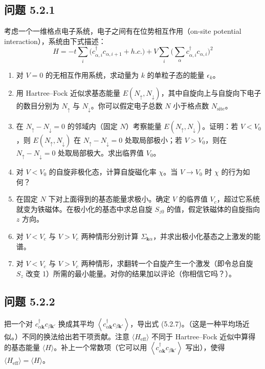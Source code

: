\subsection*{问题 5.2.1}

考虑一个一维格点电子系统，电子之间有在位势相互作用（on-site potential interaction），系统由下式描述：
\begin{equation*}
H = -t \sum_{i} \big( c^{\dagger}_{\alpha,i} c_{\alpha,i+1} + h.c. \big) + V \sum_{i} \Big( \sum_{\alpha} c^{\dagger}_{\alpha,i} c_{\alpha,i} \Big)^{2}
\end{equation*}

\begin{enumerate}
\item 对 $V=0$ 的无相互作用系统，求动量为 $k$ 的单粒子态的能量 $\epsilon_k$。
\item 用 Hartree--Fock 近似求基态能量 $E(N_{\uparrow}, N_{\downarrow})$，其中自旋向上与自旋向下电子的数目分别为 $N_{\uparrow}$ 与 $N_{\downarrow}$。你可以假定电子总数 $N$ 小于格点数 $N_{\mathrm{site}}$。
\item 在 $N_{\uparrow}-N_{\downarrow}=0$ 的邻域内（固定 $N$）考察能量 $E(N_{\uparrow}, N_{\downarrow})$。证明：若 $V<V_0$，则 $E(N_{\uparrow}, N_{\downarrow})$ 在 $N_{\uparrow}-N_{\downarrow}=0$ 处取局部极小；若 $V>V_0$，则在 $N_{\uparrow}-N_{\downarrow}=0$ 处取局部极大。求出临界值 $V_0$。
\item 对 $V<V_0$ 的自旋非极化态，计算自旋磁化率 $\chi$。当 $V\to V_0$ 时 $\chi$ 的行为如何？
\item 在固定 $N$ 下对上面得到的基态能量求极小。确定 $V$ 的临界值 $V_c$，超过它系统就变为铁磁体。在极小化的基态中求总自旋 $S_{z0}$ 的值，假定铁磁体的自旋指向 $z$ 方向。
\item 对 $V<V_c$ 与 $V>V_c$ 两种情形分别计算 $\Sigma_{\pmb{k}\alpha}$，并求出极小化基态之上激发的能谱。
\item 对 $V<V_c$ 与 $V>V_c$ 两种情形，求翻转一个自旋产生一个激发（即令总自旋 $S_z$ 改变 1）所需的最小能量。对你的结果加以评论（你相信它吗？）。
\end{enumerate}

\subsection*{问题 5.2.2}

把一个对 $c^{\dagger}_{\alpha\pmb{k}} c_{\beta\pmb{k}'}$ 换成其平均 $\left\langle c^{\dagger}_{\alpha\pmb{k}} c_{\beta\pmb{k}'} \right\rangle$，导出式 (5.2.7)。（这是一种平均场近似。）不同的换法给出若干项贡献。注意 $\langle H_{\mathrm{eff}} \rangle$ 不同于 Hartree--Fock 近似中算得的基态能量 $\langle H \rangle$。补上一个常数项（它可以用 $\left\langle c^{\dagger}_{\alpha\pmb{k}} c_{\beta\pmb{k}'} \right\rangle$ 写出），使得 $\langle H_{\mathrm{eff}} \rangle = \langle H \rangle$。

